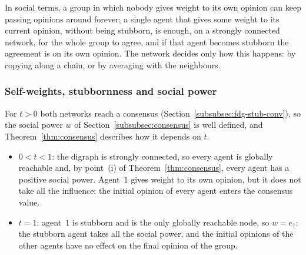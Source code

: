 In social terms, a group in which nobody gives weight to its own opinion can keep
passing opinions around forever; a single agent that gives some weight to its current
opinion, without being stubborn, is enough, on a strongly connected network, for the
whole group to agree, and if that
agent becomes stubborn the agreement is on its own opinion. The network decides only
how this happens: by copying along a chain, or by averaging with the neighbours.

\subsubsection{Self-weights, stubbornness and social power}
\label{subsubsec:fdg-stub-power}

For $t > 0$ both networks reach a consensus (Section~\ref{subsubsec:fdg-stub-conv}),
so the social power $w$ of Section~\ref{subsubsec:consensus} is well defined, and
Theorem~\ref{thm:consensus} describes how it depends on $t$.
\begin{itemize}
  \item $0 < t < 1$: the digraph is strongly connected, so every agent is globally
        reachable and, by point~(i) of Theorem~\ref{thm:consensus}, every agent has a
        positive social power. Agent~$1$ gives weight to its own opinion, but it does
        not take all the influence: the initial opinion of every agent enters the
        consensus value.
  \item $t = 1$: agent~$1$ is stubborn and is the only globally reachable node, so
        $w = e_1$: the stubborn agent takes all the social power, and the initial
        opinions of the other agents have no effect on the final opinion of the group.
\end{itemize}

